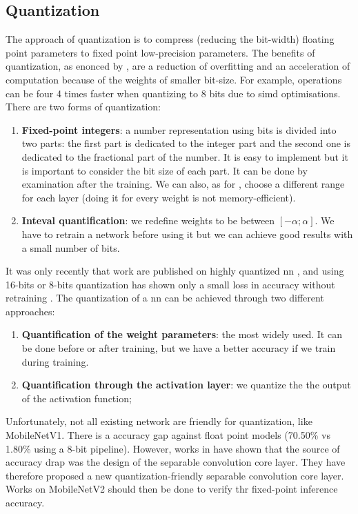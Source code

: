 \subsection{Quantization}
The approach of quantization is to compress (reducing the bit-width) floating point parameters to fixed point low-precision parameters. The benefits of quantization, as enonced by \cite{joos_de_ter_beerst_accelerating_2019}, are a reduction of overfitting and an acceleration of computation because of the weights of smaller bit-size. For example, operations can be four 4 times faster when quantizing to 8 bits due to \acrshort{simd} optimisations. \newline \newline
%
There are two forms of quantization:
\begin{enumerate}
    \item \textbf{Fixed-point integers}: a number representation using bits is divided into two parts: the first part is dedicated to the integer part and the second one is dedicated to the fractional part of the number. It is easy to implement but it is important to consider the bit size of each part. It can be done by examination after the training. We can also, as for \cite{21,22}, choose a different range for each layer (doing it for every weight is not memory-efficient).
    \item \textbf{Inteval quantification}: we redefine weights to be between $[-\alpha; \alpha]$. We have to retrain a network before using it but we can achieve good results with a small number of bits.
\end{enumerate}
%
It was only recently that work are published on highly quantized \acrshort{nn} \cite{guo_survey_2018}, and using 16-bits or 8-bits quantization has shown only a small loss in accuracy without retraining \cite{abdelouahab_accelerating_2018}. The quantization of a \acrshort{nn} can be achieved through two different approaches:
\begin{enumerate}
    \item \textbf{Quantification of the weight parameters}: the most widely used. It can be done before or after training, but we have a better accuracy if we train during training.
    \item \textbf{Quantification through the activation layer}: we quantize the the output of the activation function;
\end{enumerate}
Unfortunately, not all existing network are friendly for quantization, like MobileNetV1. There is a accuracy gap against float point models (70.50\% vs 1.80\% using a 8-bit pipeline). However, works in \cite{sheng_quantization-friendly_2018} have shown that the source of accuracy drap was the design of the separable convolution core layer. They have therefore proposed a new quantization-friendly separable convolution core layer. Works on MobileNetV2 should then be done to verify thr fixed-point inference accuracy.
